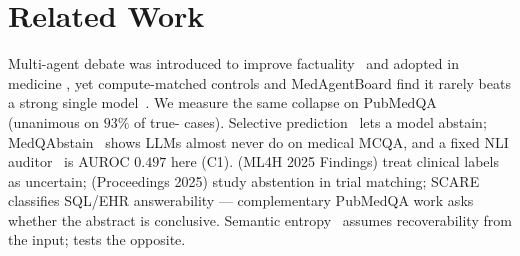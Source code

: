 \section{Related Work}
\label{sec:related}

Multi-agent debate was introduced to improve
factuality~\citep{du2023debate} and adopted in medicine
\citep{tang2024medagents,kim2024mdagents,chen2024reconcile}, yet
compute-matched controls and MedAgentBoard find it rarely beats a
strong single model~\citep{wang2023selfconsistency,smit2024mad,choi2025debate,zhang2025stop,zhu2025medagentboard}.
We measure the same collapse on PubMedQA \maybe{} (unanimous on $93\%$
of true-\maybe{} cases). Selective prediction~\citep{elyaniv2010foundations}
lets a model abstain; MedQAbstain~\citep{cocchieri2026llms} shows LLMs
almost never do on medical MCQA, and a fixed NLI
auditor~\citep{abdaljalil2026knowing} is AUROC $0.497$ here (C1).
\citet{lionetti2025clinical} (ML4H 2025 Findings) treat clinical labels
as uncertain; \citet{tramontini2026rag} (Proceedings 2025) study
abstention in trial matching; SCARE~\citep{lee2026scare} classifies
SQL/EHR answerability --- complementary PubMedQA work asks whether the
abstract is conclusive. Semantic entropy~\citep{kuhn2023semantic}
assumes recoverability from the input; \maybe{} tests the opposite.
